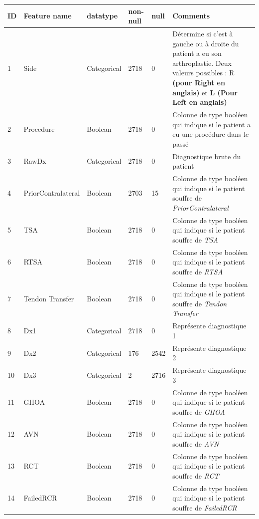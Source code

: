 \documentclass[12pt, french]{report}
\begin{document}
\begin{longtable}{| p{} | p{} | p{} | p{}  | p{} | p{} |  } 
\hline
\textbf{ID} & \textbf{Feature name} & \textbf{datatype} & \textbf{non-null }& \textbf{ null } & \textbf{Comments}\\ \hline

1 &	Side & Categorical & 2718 & 0 & Détermine si c'est à gauche ou à droite du patient a eu son arthroplastie. Deux valeurs possibles : R \textbf{(pour Right en anglais)} et \textbf{ L (Pour Left en anglais)} \\ \hline 
2 &	Procedure & Boolean & 2718 & 0& Colonne de type booléen qui indique si le patient  a eu une procédure dans le passé \\ \hline 
3 &	RawDx & Categorical & 2718 & 0 & Diagnostique brute du patient  \\ \hline 
4 &	PriorContralateral & Boolean & 2703 & 15& Colonne de type booléen qui indique si le patient souffre  de \textit{PriorContralateral} \\ \hline 
5 &	TSA & Boolean & 2718 & 0& Colonne de type booléen qui indique si le patient souffre  de \textit{TSA} \\ \hline 
6 &	RTSA & Boolean & 2718 & 0& Colonne de type booléen qui indique si le patient souffre  de \textit{RTSA} \\ \hline 
7 &	Tendon Transfer & Boolean & 2718 & 0& Colonne de type booléen qui indique si le patient souffre  de \textit{Tendon Transfer} \\ \hline 
8 &	Dx1 & Categorical & 2718 & 0 & Représente diagnostique 1 \\ \hline 
9 &	Dx2 & Categorical & 176 & 2542 & Représente diagnostique 2 \\ \hline 
10 &	Dx3 & Categorical & 2 & 2716 & Représente diagnostique 3 \\ \hline 
11 &	GHOA & Boolean & 2718 & 0& Colonne de type booléen qui indique si le patient souffre  de \textit{GHOA} \\ \hline 
12 &	AVN & Boolean & 2718 & 0& Colonne de type booléen qui indique si le patient souffre  de \textit{AVN} \\ \hline 
13 &	RCT & Boolean & 2718 & 0& Colonne de type booléen qui indique si le patient souffre  de \textit{RCT} \\ \hline 
14 &	FailedRCR & Boolean & 2718 & 0& Colonne de type booléen qui indique si le patient souffre  de \textit{FailedRCR} \\ \hline 

\end{longtable}
\end{document}
